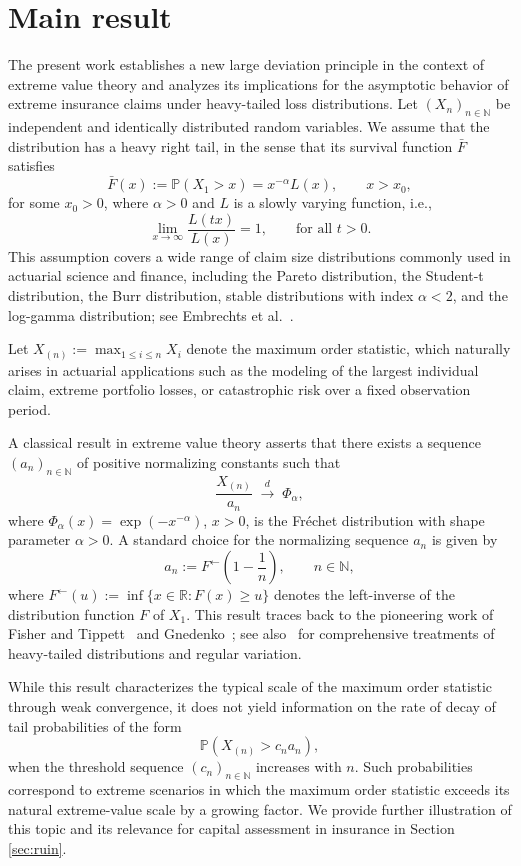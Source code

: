 \documentclass[11pt,reqno]{amsart}
\theoremstyle{definition}
\theoremstyle{remark}
\numberwithin{equation}{section}
\begin{document}
\section{Main result}\label{sec:main}
The present work establishes a new large deviation principle in the context of extreme value theory and analyzes its implications for the asymptotic behavior of extreme insurance claims under heavy-tailed loss distributions. 
Let $(X_n)_{n\in\mathbb{N}}$ be independent and identically distributed
 random variables. We assume that the  distribution has a heavy right tail, in the sense
that its survival function $\bar F$ satisfies
\[
\bar F(x) := \mathbb{P}(X_1 > x) = x^{-\alpha} L(x), \qquad x > x_0,
\]
for some $x_0 > 0$, where $\alpha > 0$ and $L$ is a slowly varying function, i.e.,
\[
\lim_{x\to\infty} \frac{L(tx)}{L(x)} = 1,
\qquad \text{for all } t > 0.
\]
This assumption covers a wide range of claim size distributions commonly used
in actuarial science and finance, including the Pareto distribution, the Student-t distribution, the Burr distribution, stable distributions with index $\alpha<2$, and the log-gamma distribution; see
Embrechts et al.~\cite{Embrechts}.

Let $X_{(n)} := \max_{1 \le i \le n} X_i$ 
denote the maximum order statistic, which naturally arises in actuarial
applications such as the modeling of the largest individual claim, extreme portfolio losses,
or catastrophic risk over a fixed observation period.  

A classical result in extreme value theory asserts that there exists a sequence $(a_n)_{n\in\mathbb{N}}$ of positive normalizing constants such that
\[
\frac{X_{(n)}}{a_n}
\;\xrightarrow{d}\;
\Phi_{\alpha},
\]
where $\Phi_{\alpha}(x) = \exp(-x^{-\alpha})$, $x > 0$, is the Fr\'echet distribution with shape parameter $\alpha > 0$. A standard choice for the normalizing sequence $a_n$ is given by 
\begin{equation}\label{eq:an_def}
a_n := F^{\leftarrow}\!\left(1-\frac{1}{n}\right),
\qquad n \in \mathbb{N},
\end{equation}
where $F^{\leftarrow}(u) := \inf\{x \in \mathbb{R} : F(x) \ge u\}$ denotes the left-inverse of the distribution function $F$ of $X_1$. This result traces back to the pioneering work of Fisher and Tippett~\cite{fisher-tippett}
and Gnedenko~\cite{gnedenko}; see also~\cite{Embrechts,resnick} for comprehensive treatments
of heavy-tailed distributions and regular variation. 

While this result characterizes the typical scale of the maximum order statistic through weak convergence, it does not yield information on the  rate of decay of tail probabilities of the form
$$
\mathbb{P}(X_{(n)}>c_n a_n),
$$
when the threshold sequence $(c_n)_{n\in\mathbb{N}}$ increases with $n$. 
Such probabilities correspond to extreme  scenarios in which the maximum order statistic exceeds its natural extreme-value scale by a growing factor. We provide further illustration of this topic and its relevance for capital assessment in insurance in Section \ref{sec:ruin}.
\end{document}
